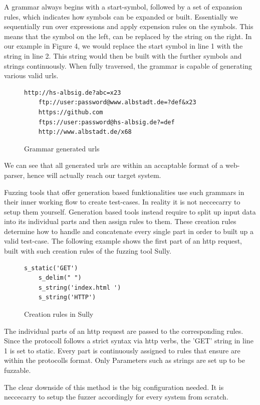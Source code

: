 \documentclass[journal=tosc,final]{iacrtrans}
\begin{document}
A grammar always begins with a start-symbol, followed by a set of expansion rules, which indicates how symbols can be expanded or built. 
Essentially we sequentially run over expressions and apply expension rules on the symbols. This means that the symbol on the left, can be replaced by the string on the right. In our example in Figure 4, we would replace the start symbol in line 1 with the string in line 2. This string would then be built with the further symbols and strings continuously. When fully traversed, the grammar is capable of generating various valid urls.
\begin{figure}[h]
 \caption{Grammar generated urls}
 \begin{lstlisting}[style=code]
	http://hs-albsig.de?abc=x23
	ftp://user:password@www.albstadt.de=?def&x23
	https://github.com
	ftps://user:password@hs-albsig.de?=def
	http://www.albstadt.de/x68
 \end{lstlisting} 
\end{figure}
\newpage
We can see that all generated urls are within an accaptable format of a web-parser, hence will actually reach our target system.

Fuzzing tools that offer generation based funktionalities use such grammars in their inner working flow to create test-cases. In reality it is not neccecarry to setup them yourself. Generation based tools instead require to split up input data into its individual parts and then assign rules to them. These creation rules determine how to handle and concatenate every single part in order to built up a valid test-case. The following example shows the first part of an http request, built with such creation rules of the fuzzing tool Sully.
\begin{figure}[h]
 \caption{Creation rules in Sully}
 \begin{lstlisting}[style=code]
	s_static('GET')
	s_delim(" ")
	s_string('index.html ')
	s_string('HTTP')
 \end{lstlisting}
\end{figure}
The individual parts of an http request are passed to the corresponding rules. Since the protocoll follows a strict syntax via http verbs, the 'GET' string in line 1 is set to static. Every part is continuously assigned to rules that ensure are within the protocolls format. Only Parameters such as strings are set up to be fuzzable.
   
The clear downside of this method is the big configuration needed. It is neccecarry to setup the fuzzer accordingly for every system from scratch. 
\end{document}
